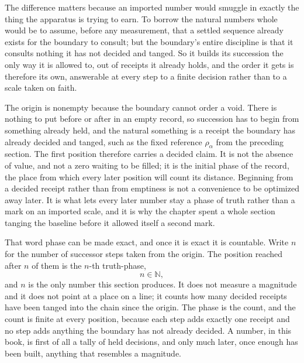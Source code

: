 The difference matters because an imported number would smuggle in exactly the thing the apparatus is trying to earn. To borrow the natural numbers whole would be to assume, before any measurement, that a settled sequence already exists for the boundary to consult; but the boundary's entire discipline is that it consults nothing it has not decided and tanged. So it builds its succession the only way it is allowed to, out of receipts it already holds, and the order it gets is therefore its own, answerable at every step to a finite decision rather than to a scale taken on faith.

The origin is nonempty because the boundary cannot order a void. There is nothing to put before or after in an empty record, so succession has to begin from something already held, and the natural something is a receipt the boundary has already decided and tanged, such as the fixed reference \(\rho_\alpha\) from the preceding section. The first position therefore carries a decided claim. It is not the absence of value, and not a zero waiting to be filled; it is the initial phase of the record, the place from which every later position will count its distance. Beginning from a decided receipt rather than from emptiness is not a convenience to be optimized away later. It is what lets every later number stay a phase of truth rather than a mark on an imported scale, and it is why the chapter spent a whole section tanging the baseline before it allowed itself a second mark.

That word phase can be made exact, and once it is exact it is countable. Write \(n\) for the number of successor steps taken from the origin. The position reached after \(n\) of them is the \(n\)-th truth-phase,
\[
  n \in \mathbb{N},
\]
and \(n\) is the only number this section produces. It does not measure a magnitude and it does not point at a place on a line; it counts how many decided receipts have been tanged into the chain since the origin. The phase is the count, and the count is finite at every position, because each step adds exactly one receipt and no step adds anything the boundary has not already decided. A number, in this book, is first of all a tally of held decisions, and only much later, once enough has been built, anything that resembles a magnitude.

